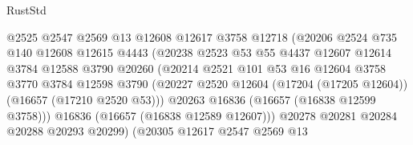 \begin{lexlean}{RustStd}
\begin{coremodule}
                                  @2525
                                  @2547
                                  @2569
                                  @13
                                  @12608
                                  @12617
                                  @3758
                                  @12718
                                  (@20206
                                    @2524
                                    @735
                                    @140
                                    @12608
                                    @12615
                                    @4443
                                    (@20238
                                      @2523
                                      @53
                                      @55
                                      @4437
                                      @12607
                                      @12614
                                      @3784
                                      @12588
                                      @3790
                                      @20260
                                      (@20214
                                        @2521
                                        @101
                                        @53
                                        @16
                                        @12604
                                        @3758
                                        @3770
                                        @3784
                                        @12598
                                        @3790
                                        (@20227
                                          @2520
                                          @12604
                                          (@17204 (@17205 @12604))
                                          (@16657 (@17210 @2520 @53)))
                                        @20263
                                        @16836
                                        (@16657 (@16838 @12599 @3758)))
                                      @16836
                                      (@16657 (@16838 @12589 @12607)))
                                    @20278
                                    @20281
                                    @20284
                                    @20288
                                    @20293
                                    @20299)
                                  (@20305
                                    @12617
                                    @2547
                                    @2569
                                    @13

\end{coremodule}
\end{lexlean}

